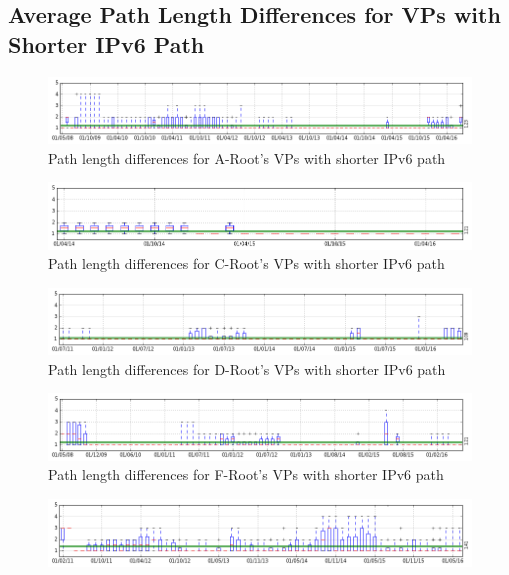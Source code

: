\begin{appendices}
	\chapter{Average Path Length Differences for VPs with Shorter IPv6 Path}
	\label{app:shorter-ipv6}
	\begin{figure}[!htb]
		\centering
		\includegraphics[width=6.0in]{img/shorter-ipv6-a.png}
		\caption{Path length differences for A-Root's VPs with shorter IPv6 path}
		\label{fig:app:shorter-ipv6-a}
	\end{figure}
	\begin{figure}[!htb]
		\centering
		\includegraphics[width=6.0in]{img/shorter-ipv6-c.png}
		\caption{Path length differences for C-Root's VPs with shorter IPv6 path}
		\label{fig:app:shorter-ipv6-c}
	\end{figure}
	\begin{figure}[!htb]
		\centering
		\includegraphics[width=6.0in]{img/shorter-ipv6-d.png}
		\caption{Path length differences for D-Root's VPs with shorter IPv6 path}
		\label{fig:app:shorter-ipv6-d}
	\end{figure}
	\begin{figure}[!htb]
		\centering
		\includegraphics[width=6.0in]{img/shorter-ipv6-f.png}
		\caption{Path length differences for F-Root's VPs with shorter IPv6 path}
		\label{fig:app:shorter-ipv6-f}
	\end{figure}
	\begin{figure}[!htb]
		\centering
		\includegraphics[width=6.0in]{img/shorter-ipv6-i.png}

\end{figure}
\end{appendices}

